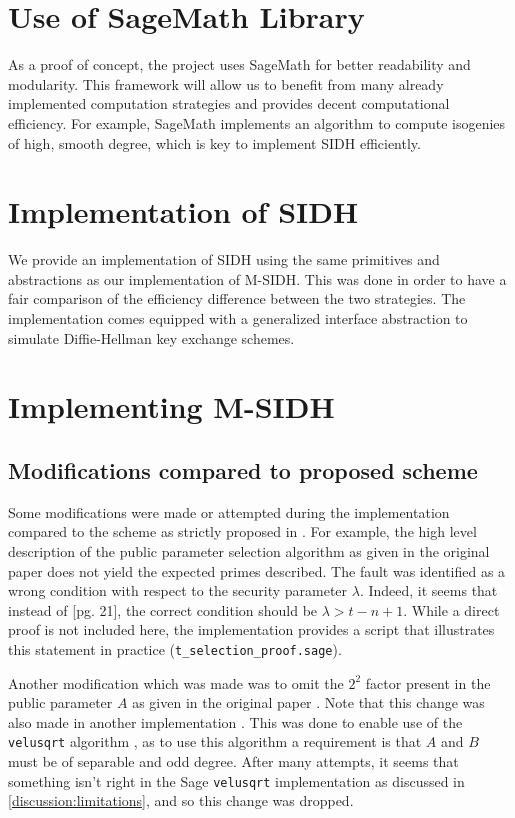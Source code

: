 \documentclass[a4paper,11pt,oneside]{report}
\begin{document}
\section{Use of SageMath Library}

    As a proof of concept, the project uses SageMath \cite{sagemath} for better readability and modularity. This framework will allow us to benefit from many already implemented computation strategies and provides decent computational efficiency. For example, SageMath implements an algorithm to compute isogenies of high, smooth degree, which is key to implement SIDH efficiently.
    
\section{Implementation of SIDH}

    We provide an implementation of SIDH using the same primitives and abstractions as our implementation of M-SIDH. This was done in order to have a fair comparison of the efficiency difference between the two strategies. The implementation comes equipped with a generalized interface abstraction to simulate Diffie-Hellman key exchange schemes.
        
\section{Implementing M-SIDH}

    \subsection{Modifications compared to proposed scheme}

    Some modifications were made or attempted during the implementation compared to the scheme as strictly proposed in \cite{msidh}. For example, the high level description of the public parameter selection algorithm as given in the original paper does not yield the expected primes described. The fault was identified as a wrong condition with respect to the security parameter $\lambda$. Indeed, it seems that instead of \textit{ }[pg. 21], the correct condition should be $\lambda > t - n + 1$. While a direct proof is not included here, the implementation provides a script that illustrates this statement in practice (\texttt{t\_selection\_proof.sage}).

    Another modification which was made was to omit the $2^2$ factor present in the public parameter $A$ as given in the original paper \cite{msidh}. Note that this change was also made in another implementation \cite{compression}. This was done to enable use of the \texttt{velusqrt} algorithm \cite{velusqrt}, as to use this algorithm a requirement is that $A$ and $B$ must be of separable and odd degree. After many attempts, it seems that something isn't right in the Sage \texttt{velusqrt} implementation as discussed in \autoref{discussion:limitations}, and so this change was dropped.
\end{document}
